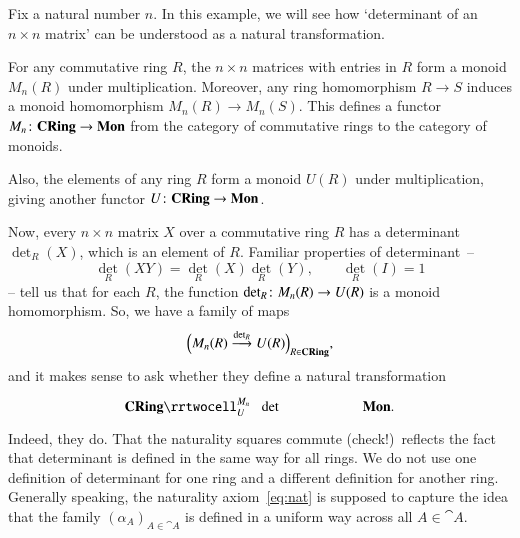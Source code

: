 \begin{example}
Fix a natural number $n$.  In this example, we will see how `determinant%
%
%
of an $n \times n$ matrix' can be understood as a natural transformation.

For any commutative ring $R$, the $n \times n$ matrices with entries in $R$
form a monoid $M_n(R)$ under multiplication.  Moreover, any ring
homomorphism $R \to S$ induces a monoid homomorphism $M_n(R) \to M_n(S)$.
This defines a functor $M_n\from \CRing \to \Mon$ from the category of
commutative rings to the category of monoids.

Also, the elements of any ring $R$ form a monoid $U(R)$ under multiplication,
giving another functor $U\from \CRing \to \Mon$.

Now, every $n \times n$ matrix $X$ over a commutative ring $R$
has a determinant ${\det}_R(X)$, which is an element of $R$.
Familiar properties of determinant~--
\[
{\det}_R(XY) = {\det}_R(X) {\det}_R(Y),
\qquad
{\det}_R(I) = 1
\]
-- tell us that for each $R$, the function ${\det}_R\from M_n(R) \to U(R)$
is a monoid homomorphism.  So, we have a family of maps
\[
\Bigl( M_n(R) \stackrel{\det_R}{\longrightarrow} U(R) \Bigr)_{R \in \mathbf{CRing}},
\]
and it makes sense to ask whether they define a natural transformation
\[
\xymatrix{
\CRing \rrtwocell^{M_n}_U{\hspace{.8em}\det} &&\Mon.
}
\]
Indeed, they do.  That the naturality squares commute (check!)\ reflects
the fact that determinant is defined in the same way for all rings.  We do
not use one definition of determinant for one ring and a different
definition for another ring.  Generally speaking, the naturality
axiom~\eqref{eq:nat} is supposed to capture the idea that the family
$(\alpha_A)_{A \in \cat{A}}$ is defined in a uniform way across all $A \in
\cat{A}$.
\end{example}

